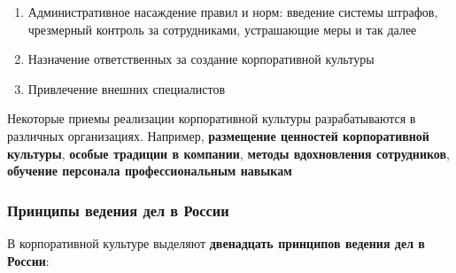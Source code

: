 \documentclass[a4paper,14pt]{extarticle}
\begin{document}
\begin{enumerate}
    \item Административное насаждение правил и норм: введение системы штрафов, чрезмерный контроль за сотрудниками, устрашающие меры и так далее
    \item Назначение ответственных за создание корпоративной культуры
    \item Привлечение внешних специалистов
\end{enumerate}

Некоторые приемы реализации корпоративной культуры разрабатываются в различных организациях. Например, \textbf{размещение ценностей корпоративной культуры}, \textbf{особые традиции в компании}, \textbf{методы вдохновления сотрудников}, \textbf{обучение персонала профессиональным навыкам}

\subsubsection{Принципы ведения дел в России}

В корпоративной культуре выделяют \textbf{двенадцать принципов ведения дел в России}:
\end{document}
